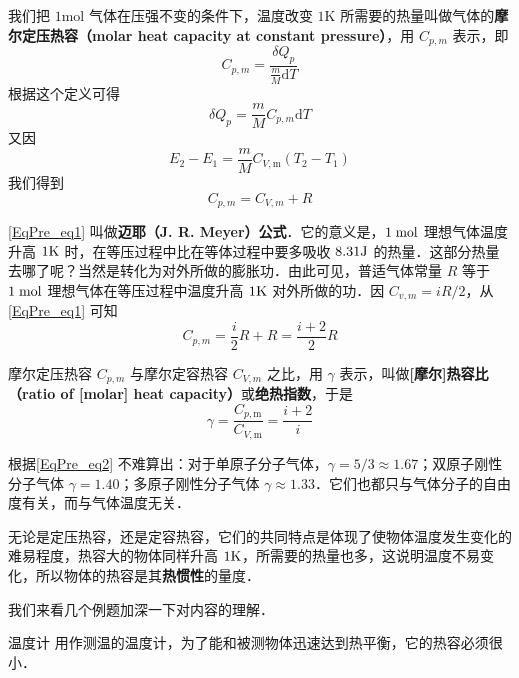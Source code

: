 我们把 $1\mathrm{mol}$ 气体在压强不变的条件下，温度改变 $1\mathrm K$ 所需要的热量叫做气体的\textbf{摩尔定压热容（molar heat capacity at constant pressure）}，用 $C_{p,m}$ 表示，即
\begin{equation}
C_{p, {m}}=\frac{\delta Q_{p}}{\frac{m}{M} \mathrm{d} T}
\end{equation}
根据这个定义可得
\begin{equation}
\delta Q_{p}=\frac{m}{M} C_{p, {m}} \mathrm{d} T
\end{equation}
又因
\begin{equation}
E_{2}-E_{1}=\frac{m}{M} C_{V, \mathrm{m}}\left(T_{2}-T_{1}\right)
\end{equation}
我们得到
\begin{equation} \label{EqPre_eq1}
C_{p, m}=C_{V, m}+R
\end{equation}

\autoref{EqPre_eq1} 叫做\textbf{迈耶（J. R. Meyer）公式}．它的意义是，$1\; \rm mol$ 理想气体温度升高 $1\rm K$ 时，在等压过程中比在等体过程中要多吸收 $8. 31\rm J $ 的热量．这部分热量去哪了呢？当然是转化为对外所做的膨胀功．由此可见，普适气体常量 $R$ 等于 $1\;\rm mol$ 理想气体在等压过程中温度升高 $1\rm K$ 对外所做的功．因 $C_{v, m}=iR/2$，从\autoref{EqPre_eq1} 可知
\begin{equation}
C_{p, {m}}=\frac{i}{2} R+R=\frac{i+2}{2} R
\end{equation}

摩尔定压热容 $C_{p,m}$ 与摩尔定容热容 $C_{V,m}$ 之比，用 $\gamma$ 表示，叫做\textbf{[摩尔]热容比（ratio of [molar] heat capacity）}或\textbf{绝热指数}，于是
\begin{equation} \label{EqPre_eq2}
\gamma=\frac{C_{p, \mathrm{m}}}{C_{V, \mathrm{m}}}=\frac{i+2}{i}
\end{equation}

根据\autoref{EqPre_eq2} 不难算出：对于单原子分子气体，$\gamma=5/3\approx 1.67$；双原子刚性分子气体 $\gamma=1.40$；多原子刚性分子气体 $\gamma\approx 1. 33 $．它们也都只与气体分子的自由度有关，而与气体温度无关．

无论是定压热容，还是定容热容，它们的共同特点是体现了使物体温度发生变化的难易程度，热容大的物体同样升高 $1\rm K$，所需要的热量也多，这说明温度不易变化，所以物体的热容是其\textbf{热惯性}的量度．

我们来看几个例题加深一下对内容的理解．

\begin{example}{温度计}
用作测温的温度计，为了能和被测物体迅速达到热平衡，它的热容必须很小．
\end{example}

